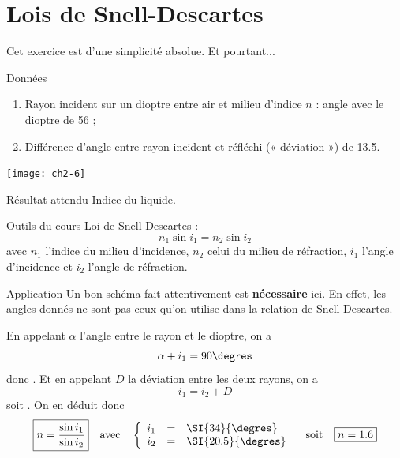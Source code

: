\documentclass[../main/main.tex]{subfiles}
\begin{document}
\newpage

\section{Lois de Snell-Descartes}
Cet exercice est d'une simplicité absolue. Et pourtant...
\begin{tcbraster}[raster columns=5, raster equal height=rows]
    \begin{NCdefi}[raster multicolumn=3, sidebyside, righthand width=4cm]{Données}
        \begin{enumerate}
            \item Rayon incident sur un dioptre entre air et milieu d'indice $n$ :
                angle {\huge avec le dioptre} de \SI{56}{\degres} ;
            \item Différence d'angle entre rayon incident et réfléchi (« déviation
                ») de \SI{13.5}{\degres}.
        \end{enumerate}
        \tcblower
        \begin{center}
            \texttt{[image: ch2-6]}
        \end{center}
    \end{NCdefi}    
    \begin{tcolorbox}[blankest, raster multicolumn=2, space to=\myspace]
        \begin{tcbraster}[raster columns=1]
            \begin{NCprop}[add to natural height=\myspace]{Résultat attendu}
                Indice du liquide.
            \end{NCprop}
            \begin{NCdemo}{Outils du cours}
                Loi de Snell-Descartes :
                \[ n_1\sin i_1 = n_2 \sin i_2 \]
                avec $n_1$ l'indice du milieu d'incidence, $n_2$ celui du milieu
                de réfraction, $i_1$ l'angle d'incidence et $i_2$ l'angle de
                réfraction.
            \end{NCdemo}
        \end{tcbraster}
    \end{tcolorbox}
\end{tcbraster}

\begin{NCexem}{Application}
    Un bon schéma fait attentivement est \textbf{nécessaire} ici. En effet,
    les angles donnés ne sont pas ceux qu'on utilise dans la relation de
    Snell-Descartes. \bigbreak
    
    En appelant $\alpha$ l'angle entre le rayon et le dioptre, on a
    \[ \alpha + i_1 = 90\degres\]
    donc . Et en appelant $D$ la déviation entre
    les deux rayons, on a
    \[ i_1 = i_2 + D\]
    soit . On en déduit donc
    \[\boxed{n = \frac{\sin i_1}{\sin i_2}} \quad \text{avec} \quad
        \left\{
            \begin{array}{rcl}
                i_1 & = & \SI{34}{\degres}\\
                i_2 & = & \SI{20.5}{\degres}
            \end{array}
    \right. \quad \text{soit} \quad \boxed{n = 1.6}
    \]
\end{NCexem}
\end{document}
